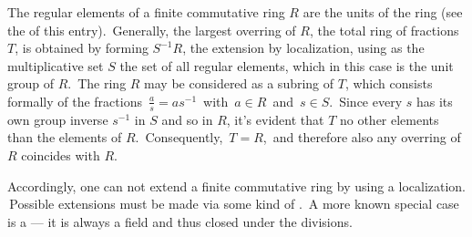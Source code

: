 \documentclass[12pt]{article}
\theoremstyle{definition}
\begin{document}
The regular elements of a finite commutative ring $R$ are the units of the ring (see the  of this entry). \,Generally, the largest overring of $R$, the total ring of fractions $T$, is obtained by forming $S^{-1}R$, the extension by localization, using as the multiplicative set $S$ the set of all regular elements, which in this case is the unit group of $R$. \,The ring $R$ may be considered as a subring of $T$, which consists formally of the fractions \,$\frac{a}{s} = as^{-1}$\, with \,$a\in R$\, and \,$s\in S$. \,Since every $s$ has its own group inverse $s^{-1}$ in $S$ and so in $R$, it's evident that $T$  no other elements than the elements of $R$. \,Consequently, \,$T = R$,\, and therefore also any overring of $R$ coincides with $R$.

Accordingly, one can not extend a finite commutative ring by using a localization. \,Possible extensions must be made via some kind of . \,A more known special case is a  --- it is always a field and thus closed under the divisions.
\end{document}
